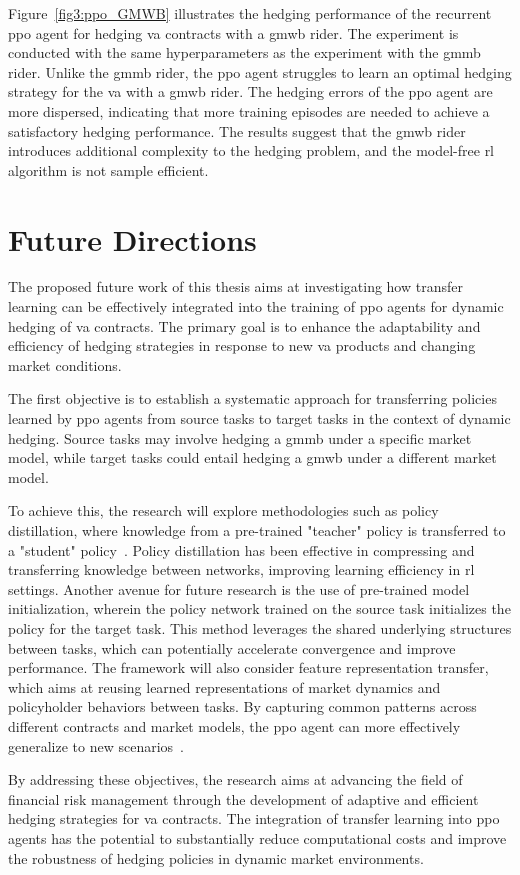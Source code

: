Figure~\ref{fig3:ppo_GMWB} illustrates the hedging performance of the recurrent \gls{ppo} agent for hedging \gls{va} contracts with a \gls{gmwb} rider.
The experiment is conducted with the same hyperparameters as the experiment with the \gls{gmmb} rider.
Unlike the \gls{gmmb} rider, the \gls{ppo} agent struggles to learn an optimal hedging strategy for the \gls{va} with a \gls{gmwb} rider.
The hedging errors of the \gls{ppo} agent are more dispersed, indicating that more training episodes are needed to achieve a satisfactory hedging performance.
The results suggest that the \gls{gmwb} rider introduces additional complexity to the hedging problem, and the model-free \gls{rl} algorithm is not sample efficient.

\section{Future Directions} \label{sec:FutureDirections}

The proposed future work of this thesis aims at investigating how transfer learning can be effectively integrated into the training of \gls{ppo} agents for dynamic hedging of \gls{va} contracts. 
The primary goal is to enhance the adaptability and efficiency of hedging strategies in response to new \gls{va} products and changing market conditions. 


The first objective is to establish a systematic approach for transferring policies learned by \gls{ppo} agents from source tasks to target tasks in the context of dynamic hedging. 
Source tasks may involve hedging a \gls{gmmb} under a specific market model, while target tasks could entail hedging a \gls{gmwb} under a different market model.

To achieve this, the research will explore methodologies such as policy distillation, where knowledge from a pre-trained "teacher" policy is transferred to a "student" policy~\citep{rusu2015policy}.
Policy distillation has been effective in compressing and transferring knowledge between networks, improving learning efficiency in \gls{rl} settings.
Another avenue for future research is the use of pre-trained model initialization, wherein the policy network trained on the source task initializes the policy for the target task. 
This method leverages the shared underlying structures between tasks, which can potentially accelerate convergence and improve performance.
The framework will also consider feature representation transfer, which aims at reusing learned representations of market dynamics and policyholder behaviors between tasks. 
By capturing common patterns across different contracts and market models, the \gls{ppo} agent can more effectively generalize to new scenarios~\citep{bengio2012deep}.

By addressing these objectives, the research aims at advancing the field of financial risk management through the development of adaptive and efficient hedging strategies for \gls{va} contracts. The integration of transfer learning into \gls{ppo} agents has the potential to substantially reduce computational costs and improve the robustness of hedging policies in dynamic market environments.